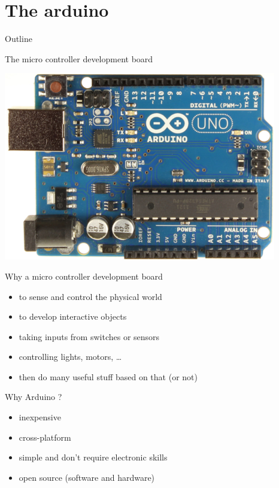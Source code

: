 \section {The arduino}
\begin {frame} {Outline}
    \tableofcontents [current]
\end {frame}

\begin {frame} {The micro controller development board}
    \begin {center}
    \includegraphics [width=.7\textwidth,keepaspectratio] {img/arduino}
    \end {center}
\end {frame}

\begin {frame} {Why a micro controller development board}
    \begin {itemize}
		\item to sense and control the physical world
		\pause
		\item to develop interactive objects
		\pause
		\item taking inputs from switches or sensors
		\pause
		\item controlling lights, motors, …
		\pause
		\item then do many useful stuff based on that (or not)
    \end {itemize}
\end {frame}

\begin{frame}{Why Arduino ?}
	\begin{itemize}
		\item inexpensive
		\pause
		\item cross-platform
		\pause
		\item simple and don't require electronic skills
		\pause
		\item open source (software and hardware)
	\end{itemize}
\end{frame}


